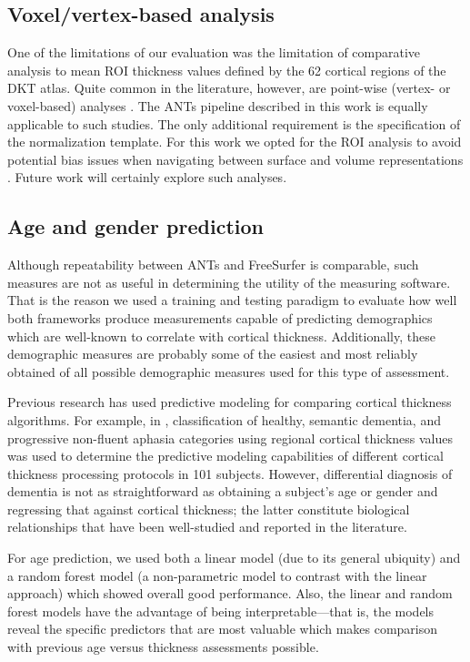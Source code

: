 \subsection{Voxel/vertex-based analysis}
One of the limitations of our evaluation was the limitation of
comparative analysis to mean ROI thickness values defined
by the 62 cortical regions of the DKT atlas.  Quite common in
the literature, however, are point-wise (vertex- or voxel-based)
analyses \citep[e.g.,][]{chung2005}.  The ANTs pipeline described in
this work is equally applicable to such studies.  The only 
additional requirement is the specification of the normalization
template.  For this work we opted for the ROI analysis to avoid
potential bias issues when navigating between surface and volume
representations \citep{klein2010}.  Future work will certainly
explore such analyses.

\subsection{Age and gender prediction} 

Although repeatability between ANTs and FreeSurfer is comparable,
such measures are not as useful in determining the utility of the 
measuring software.  That is the reason we used 
a training and testing paradigm to evaluate how well both frameworks produce measurements capable of predicting demographics which are well-known to correlate
with cortical thickness.  Additionally, these demographic measures are
probably some of the easiest and most reliably obtained of all possible
demographic measures used for this type of assessment.  

Previous research has used predictive modeling for comparing cortical
thickness algorithms.  For example, in \cite{clarkson2011}, classification
of healthy, semantic dementia, and progressive non-fluent aphasia categories
using regional cortical thickness values was used to determine the predictive
modeling capabilities of different cortical thickness processing protocols in 
101 subjects. However, differential diagnosis of dementia 
\citep{neary2005} is not as straightforward as obtaining a subject's age
or gender and regressing that against cortical thickness; the latter constitute biological
relationships that have been well-studied and reported in the literature.

For age prediction,
we used both a linear model (due to its general ubiquity) and a random
forest model (a non-parametric model to contrast with the linear approach)
which showed overall good performance.  Also, the linear  and
random forest models have the advantage of being
interpretable---that is, the models reveal the specific predictors
that are most valuable  
which makes comparison with previous age versus thickness assessments possible. 

